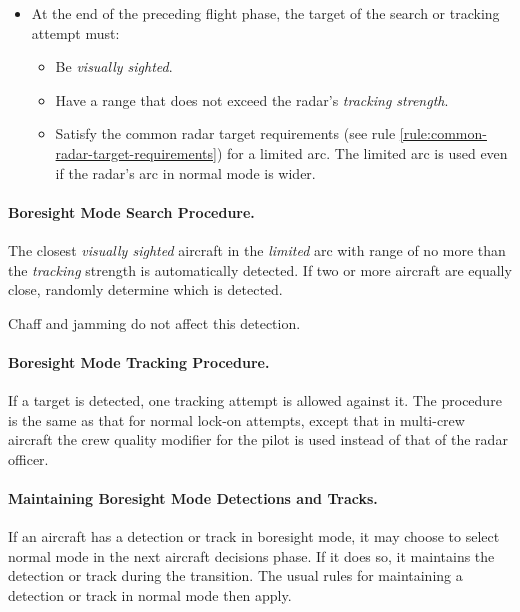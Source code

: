 \begin{advancedrules}
{\begin{itemize}
\item At the end of the preceding flight phase, the target of the search or tracking attempt must:
\begin{itemize}
    \item Be \emph{visually sighted}.
    \item Have a range that does not exceed the radar's \emph{tracking strength}.
    \item Satisfy the common radar target requirements (see rule \ref{rule:common-radar-target-requirements}) for a limited arc. The limited arc is used even if the radar's arc in normal mode is wider.
\end{itemize}

\end{itemize}

\paragraph{Boresight Mode Search Procedure.}


The closest \emph{visually sighted} aircraft in the \emph{limited} arc with range of no more than the \emph{tracking} strength is automatically detected. If two or more aircraft are equally close, randomly determine which is detected. 

Chaff and jamming do not affect this detection. 

\paragraph{Boresight Mode Tracking Procedure.}

If a target is detected, one tracking attempt is allowed against it. The procedure is the same as that for normal lock-on attempts, except that in  multi-crew aircraft the crew quality modifier for the pilot is used instead of that of the radar officer.


\paragraph{Maintaining Boresight Mode Detections and Tracks.}

If an aircraft has a detection or track in boresight mode, it may choose to select normal mode in the next aircraft decisions phase. If it does so, it maintains the detection or track during the transition. The usual rules for maintaining a detection or track in normal mode then apply.

}
\end{advancedrules}
